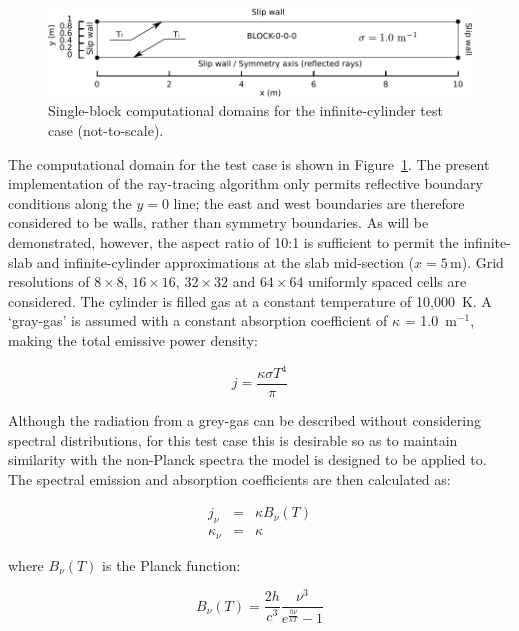 \par

\begin{figure}[b!]
\centering
\includegraphics[width=\linewidth]{radiation/figures/grayslab_1B.pdf}
\caption{Single-block computational domains for the infinite-cylinder test case (not-to-scale).}
\label{fig:GS_domains}
\end{figure}

The computational domain for the test case is shown in Figure~\ref{fig:GS_domains}.
The present implementation of the ray-tracing algorithm only permits reflective boundary conditions along the $y = 0$ line; the east and west boundaries are therefore considered to be walls, rather than symmetry boundaries.
As will be demonstrated, however, the aspect ratio of 10:1 is sufficient to permit the infinite-slab and infinite-cylinder approximations at the slab mid-section ($x=5$\,m).
Grid resolutions of $8 \times 8$,  $16 \times 16$, $32 \times 32$ and $64 \times 64$ uniformly spaced cells are considered.
The cylinder is filled gas at a constant temperature of 10,000~K.
A `gray-gas' is assumed with a constant absorption coefficient of $\kappa$ = 1.0~m$^{-1}$, making the total emissive power density:

\begin{equation}
 j = \frac{\kappa \sigma T^{4}}{\pi}
 \label{eq:grey_emission}
\end{equation}


Although the radiation from a grey-gas can be described without considering spectral distributions, for this test case this is desirable so as to maintain similarity with the non-Planck spectra the model is designed to be applied to.
The spectral emission and absorption coefficients are then calculated as:

\begin{eqnarray}
      j_{\nu} &=& \kappa B_{\nu}(T) \\
 \kappa_{\nu} &=& \kappa 
\end{eqnarray}

\noindent where $B_{\nu}(T)$ is the Planck function:

\begin{equation}
 B_{\nu}(T) = \frac{2 h}{c^3} \frac{\nu^3}{e^\frac{h \nu }{k T} -1 }
\end{equation}

